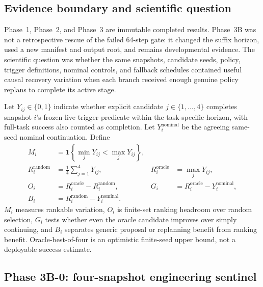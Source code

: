 
\subsection{Evidence boundary and scientific question}

Phase~1, Phase~2, and Phase~3 are immutable completed results. Phase~3B was not a retrospective rescue of the failed 64-step gate: it changed the suffix horizon, used a new manifest and output root, and remains developmental evidence. The scientific question was whether the same snapshots, candidate seeds, policy, trigger definitions, nominal controls, and fallback schedules contained useful causal recovery variation when each branch received enough genuine policy replans to complete its active stage.

Let $Y_{ij}\in\{0,1\}$ indicate whether explicit candidate $j\in\{1,\ldots,4\}$ completes snapshot $i$'s frozen live trigger predicate within the task-specific horizon, with full-task success also counted as completion. Let $Y_i^{\mathrm{nominal}}$ be the agreeing same-seed nominal continuation. Define
\begin{align}
  M_i &= \mathbf{1}\!\left\{\min_jY_{ij}<\max_jY_{ij}\right\},\\
  R_i^{\mathrm{random}} &= \frac{1}{4}\sum_{j=1}^{4}Y_{ij},
  &R_i^{\mathrm{oracle}} &= \max_jY_{ij},\\
  O_i &= R_i^{\mathrm{oracle}}-R_i^{\mathrm{random}},
  &G_i &= R_i^{\mathrm{oracle}}-Y_i^{\mathrm{nominal}},\\
  B_i &= R_i^{\mathrm{random}}-Y_i^{\mathrm{nominal}}.
\end{align}
$M_i$ measures rankable variation, $O_i$ is finite-set ranking headroom over random selection, $G_i$ tests whether even the oracle candidate improves over simply continuing, and $B_i$ separates generic proposal or replanning benefit from ranking benefit. Oracle-best-of-four is an optimistic finite-seed upper bound, not a deployable success estimate.

\subsection{Phase 3B-0: four-snapshot engineering sentinel}


